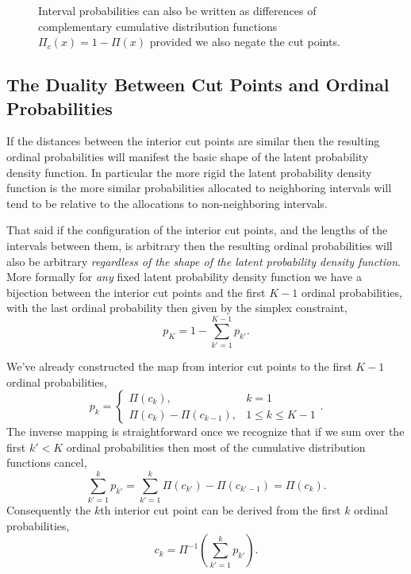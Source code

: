 \documentclass[
  letterpaper,
  DIV=11,
  numbers=noendperiod]{scrartcl}
\begin{document}
\begin{figure}


\caption{\label{fig-ccdf-calcs}Interval probabilities can also be
written as differences of complementary cumulative distribution
functions \(\Pi_{c}(x) = 1 - \Pi(x)\) provided we also negate the cut
points.}

\end{figure}%

\subsection{The Duality Between Cut Points and Ordinal
Probabilities}\label{sec:duality}

If the distances between the interior cut points are similar then the
resulting ordinal probabilities will manifest the basic shape of the
latent probability density function. In particular the more rigid the
latent probability density function is the more similar probabilities
allocated to neighboring intervals will tend to be relative to the
allocations to non-neighboring intervals.

That said if the configuration of the interior cut points, and the
lengths of the intervals between them, is arbitrary then the resulting
ordinal probabilities will also be arbitrary \emph{regardless of the
shape of the latent probability density function}. More formally for
\emph{any} fixed latent probability density function we have a bijection
between the interior cut points and the first \(K - 1\) ordinal
probabilities, with the last ordinal probability then given by the
simplex constraint, \[
p_{K} = 1 - \sum_{k' = 1}^{K - 1} p_{k'}.
\]

We've already constructed the map from interior cut points to the first
\(K - 1\) ordinal probabilities, \[
p_{k}
=
\left\{
\begin{array}{rr}
\Pi(c_{k}), & k = 1 \\
\Pi(c_{k}) - \Pi(c_{k - 1}), & 1 \le k \le K - 1
\end{array}
\right. .
\] The inverse mapping is straightforward once we recognize that if we
sum over the first \(k' < K\) ordinal probabilities then most of the
cumulative distribution functions cancel, \[
\sum_{k' = 1}^{k} p_{k'}
=
\sum_{k' = 1}^{k} \Pi(c_{k'}) - \Pi(c_{k' - 1})
=
\Pi(c_{k}).
\] Consequently the \(k\)th interior cut point can be derived from the
first \(k\) ordinal probabilities, \[
c_{k} = \Pi^{-1} \left( \sum_{k' = 1}^{k} p_{k'} \right).
\]
\end{document}
